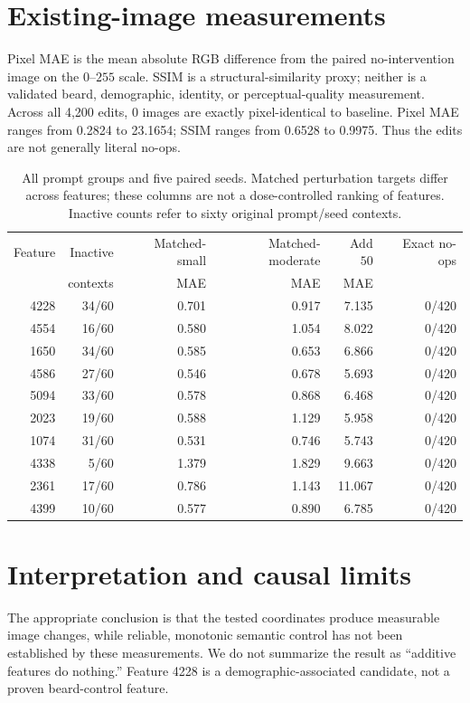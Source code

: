 \documentclass[11pt]{article}
\begin{document}
\section{Existing-image measurements}
Pixel MAE is the mean absolute RGB difference from the paired no-intervention image on the $0$--$255$ scale. SSIM is a structural-similarity proxy; neither is a validated beard, demographic, identity, or perceptual-quality measurement.
Across all 4,200 edits, 0 images are exactly pixel-identical to baseline. Pixel MAE ranges from 0.2824 to 23.1654; SSIM ranges from 0.6528 to 0.9975. Thus the edits are not generally literal no-ops.
\begin{table}[ht]\centering\small
\begin{tabular}{rrrrrr}\toprule
Feature & Inactive & Matched-small & Matched-moderate & Add $50$ & Exact no-ops\\
 & contexts & MAE & MAE & MAE & \\\midrule
4228 & 34/60 & 0.701 & 0.917 & 7.135 & 0/420  \\
4554 & 16/60 & 0.580 & 1.054 & 8.022 & 0/420  \\
1650 & 34/60 & 0.585 & 0.653 & 6.866 & 0/420  \\
4586 & 27/60 & 0.546 & 0.678 & 5.693 & 0/420  \\
5094 & 33/60 & 0.578 & 0.868 & 6.468 & 0/420  \\
2023 & 19/60 & 0.588 & 1.129 & 5.958 & 0/420  \\
1074 & 31/60 & 0.531 & 0.746 & 5.743 & 0/420  \\
4338 & 5/60 & 1.379 & 1.829 & 9.663 & 0/420  \\
2361 & 17/60 & 0.786 & 1.143 & 11.067 & 0/420  \\
4399 & 10/60 & 0.577 & 0.890 & 6.785 & 0/420  \\
\bottomrule\end{tabular}
\caption{All prompt groups and five paired seeds. Matched perturbation targets differ across features; these columns are not a dose-controlled ranking of features. Inactive counts refer to sixty original prompt/seed contexts.}
\end{table}
\section{Interpretation and causal limits}
The appropriate conclusion is that the tested coordinates produce measurable image changes, while reliable, monotonic semantic control has not been established by these measurements. We do not summarize the result as ``additive features do nothing.'' Feature 4228 is a demographic-associated candidate, not a proven beard-control feature.
\end{document}

